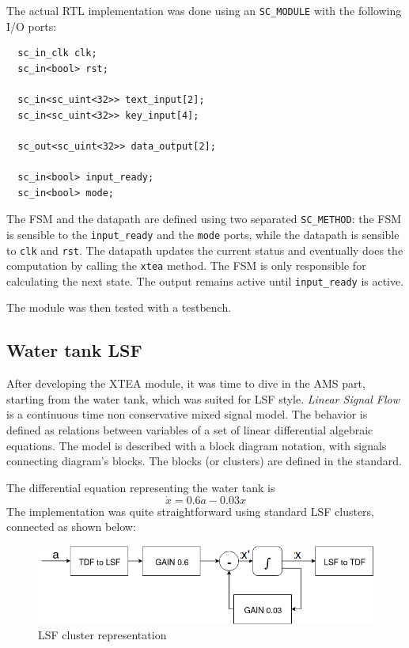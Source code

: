 \documentclass[]{IEEEtran}
\begin{document}
The actual RTL implementation was done using an \texttt{SC\_MODULE} with the following I/O ports:
\begin{verbatim}
  sc_in_clk clk;
  sc_in<bool> rst;

  sc_in<sc_uint<32>> text_input[2];
  sc_in<sc_uint<32>> key_input[4];

  sc_out<sc_uint<32>> data_output[2];

  sc_in<bool> input_ready;
  sc_in<bool> mode;
\end{verbatim}
The FSM and the datapath are defined using two separated \texttt{SC\_METHOD}: the FSM is sensible to the \texttt{input\_ready} and the \texttt{mode} ports,
while the datapath is sensible to \texttt{clk} and \texttt{rst}.
The datapath updates the current status and eventually does the computation by calling the \texttt{xtea} method.
The FSM is only responsible for calculating the next state.
The output remains active until \texttt{input\_ready} is active.

The module was then tested with a testbench.

\subsection{Water tank LSF}
After developing the XTEA module, it was time to dive in the AMS part, starting from the water tank, which was suited for LSF style.
\textit{Linear Signal Flow} is a continuous time non conservative mixed signal model. The behavior is defined as relations between variables 
of a set of linear differential algebraic equations. The model is described with a block diagram notation, with signals connecting diagram's blocks.
The blocks (or clusters) are defined in the standard.

The differential equation representing the water tank is
\begin{equation}
\dot{x}=0.6a-0.03x
\end{equation}
The implementation was quite straightforward using standard LSF clusters, connected as shown below:
\begin{figure}[h]
\centering
\includegraphics[width=1\linewidth]{figures/LSF.png}
\caption{LSF cluster representation}
\label{fig:lsf}
\end{figure}
\end{document}
